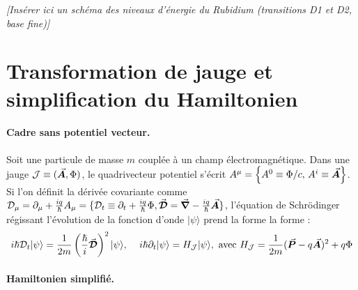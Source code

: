 \vspace{1em}
\begin{center}
\textit{[Insérer ici un schéma des niveaux d’énergie du Rubidium (transitions D1 et D2, base fine)]}
\end{center}

\section{Transformation de jauge et simplification du Hamiltonien}


\paragraph{Cadre sans potentiel vecteur.}

Soit une particule de masse $m$ couplée à un champ électromagnétique. Dans une jauge $\mathcal{J} \equiv (\vec{{\bm{A}}}, \Phi)$, le quadrivecteur potentiel s’écrit $A^\mu = \left\{ A^0 \equiv \Phi/c,\, A^i \equiv \vec{{\bm{A}}} \right\}$. Si l’on définit la dérivée covariante comme $\mathcal{D}_\mu = \partial_\mu + \frac{iq}{\hbar} A_\mu = \{ \mathcal{D}_t \equiv \partial_t + \frac{iq}{\hbar} \Phi , \vec{{\bm{\mathcal{D}}}} = \vec{{\bm{\nabla}}} - \frac{iq}{\hbar} \vec{{\bm{A}}}  \} $, l’équation de Schrödinger régissant l’évolution de la fonction d’onde $\vert \psi \rangle$  prend la forme la forme :
\begin{eqnarray}
	i\hbar \mathcal{D}_t \vert \psi \rangle = \frac{1}{2m} \left( \frac{\hbar}{i} \vec{{\bm{\mathcal{D}}}} \right)^2 \vert \psi \rangle, \, \quad   i\hbar \partial_t \vert \psi \rangle = H_{\mathcal{J}} \vert \psi \rangle , ~\mbox{avec}~	H_{\mathcal{J}} = \frac{1}{2m} (\vec{{\bm{P}}} - q \vec{{\bm{A}}})^2 + q\Phi
\end{eqnarray}


\paragraph{Hamiltonien simplifié.}

